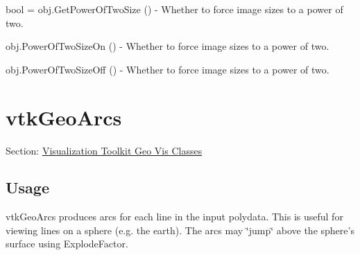 \begin{DoxyItemize}
\item {\ttfamily bool = obj.\-Get\-Power\-Of\-Two\-Size ()} -\/ Whether to force image sizes to a power of two.  
\item {\ttfamily obj.\-Power\-Of\-Two\-Size\-On ()} -\/ Whether to force image sizes to a power of two.  
\item {\ttfamily obj.\-Power\-Of\-Two\-Size\-Off ()} -\/ Whether to force image sizes to a power of two.  
\end{DoxyItemize}\hypertarget{vtkgeovis_vtkgeoarcs}{}\section{vtk\-Geo\-Arcs}\label{vtkgeovis_vtkgeoarcs}
Section\-: \hyperlink{sec_vtkgeovis}{Visualization Toolkit Geo Vis Classes} \hypertarget{vtkwidgets_vtkxyplotwidget_Usage}{}\subsection{Usage}\label{vtkwidgets_vtkxyplotwidget_Usage}
vtk\-Geo\-Arcs produces arcs for each line in the input polydata. This is useful for viewing lines on a sphere (e.\-g. the earth). The arcs may \char`\"{}jump\char`\"{} above the sphere's surface using Explode\-Factor.

